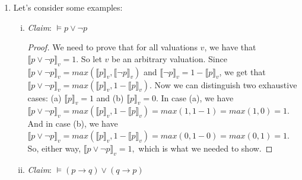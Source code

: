 \begin{enumerate}[\thesection.1]
	\item Let's consider some examples:
		
		\begin{enumerate}[(i)]
		
			\item \emph{Claim}: $\vDash p\lor\neg p$
		
			\begin{proof}
			We need to prove that for all valuations $v$, we have that $\llbracket p\lor\neg p\rrbracket_v=1$. So let $v$ be an arbitrary valuation. Since $\llbracket p\lor\neg p\rrbracket_v=max(\llbracket p\rrbracket_v,\llbracket\neg p\rrbracket_v)$ and $\llbracket \neg p\rrbracket_v=1-\llbracket p\rrbracket_v$, we get that $\llbracket p\lor\neg p\rrbracket_v=max(\llbracket p\rrbracket_v,1-\llbracket p\rrbracket_v)$. Now we can distinguish two exhaustive cases: (a) $\llbracket p\rrbracket_v=1$ and (b) $\llbracket p\rrbracket_v=0$. In case (a), we have $\llbracket p\lor\neg p\rrbracket_v=max(\llbracket p\rrbracket_v,1-\llbracket p\rrbracket_v)=max(1,1-1)=max(1,0)=1$. And in case (b), we have $\llbracket p\lor\neg p\rrbracket_v=max(\llbracket p\rrbracket_v,1-\llbracket p\rrbracket_v)=max(0, 1-0)=max(0,1)=1$. So, either way, $\llbracket p\lor\neg p\rrbracket_v=1,$ which is what we needed to show.			\end{proof}
			
			\item \emph{Claim}: $\vDash (p\to q)\lor (q\to p)$
			

\end{enumerate}
\end{enumerate}
